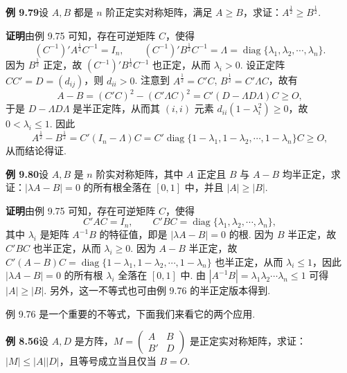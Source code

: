 \documentclass[UTF8,12pt,a4paper,fontset=fandol]{ctexart}
\begin{document}
\noindent\textbf{例 9.79}\quad 设 $A,B$ 都是 $n$ 阶正定实对称矩阵，满足 $A\ge B$，求证：$A^{\frac12}\ge B^{\frac12}$.

\noindent\textbf{证明}\quad 由例 9.75 可知，存在可逆矩阵 $C$，使得
\[
(C^{-1})'A^{\frac12}C^{-1}=I_n,\qquad
(C^{-1})'B^{\frac12}C^{-1}=\Lambda=\operatorname{diag}\{\lambda_1,\lambda_2,\cdots,\lambda_n\}.
\]
因为 $B^{\frac12}$ 正定，故 $(C^{-1})'B^{\frac12}C^{-1}$ 也正定，从而 $\lambda_i>0$. 设正定阵 $CC'=D=(d_{ij})$，则 $d_{ii}>0$. 注意到 $A^{\frac12}=C'C$, $B^{\frac12}=C'\Lambda C$，故有
\[
A-B=(C'C)^2-(C'\Lambda C)^2=C'(D-\Lambda D\Lambda)C\ge O,
\]
于是 $D-\Lambda D\Lambda$ 是半正定阵，从而其 $(i,i)$ 元素 $d_{ii}(1-\lambda_i^2)\ge0$，故 $0<\lambda_i\le1$. 因此
\[
A^{\frac12}-B^{\frac12}=C'(I_n-\Lambda)C
=C'\operatorname{diag}\{1-\lambda_1,1-\lambda_2,\cdots,1-\lambda_n\}C\ge O,
\]
从而结论得证.

\noindent\textbf{例 9.80}\quad 设 $A,B$ 是 $n$ 阶实对称矩阵，其中 $A$ 正定且 $B$ 与 $A-B$ 均半正定，求证：$|\lambda A-B|=0$ 的所有根全落在 $[0,1]$ 中，并且 $|A|\ge |B|$.

\noindent\textbf{证明}\quad 由例 9.75 可知，存在可逆矩阵 $C$，使得
\[
C'AC=I_n,\qquad C'BC=\operatorname{diag}\{\lambda_1,\lambda_2,\cdots,\lambda_n\},
\]
其中 $\lambda_i$ 是矩阵 $A^{-1}B$ 的特征值，即是 $|\lambda A-B|=0$ 的根. 因为 $B$ 半正定，故 $C'BC$ 也半正定，从而 $\lambda_i\ge0$. 因为 $A-B$ 半正定，故 $C'(A-B)C=\operatorname{diag}\{1-\lambda_1,1-\lambda_2,\cdots,1-\lambda_n\}$ 也半正定，从而 $\lambda_i\le1$，因此 $|\lambda A-B|=0$ 的所有根 $\lambda_i$ 全落在 $[0,1]$ 中. 由 $|A^{-1}B|=\lambda_1\lambda_2\cdots\lambda_n\le1$ 可得 $|A|\ge |B|$. 另外，这一不等式也可由例 9.76 的半正定版本得到.

例 9.76 是一个重要的不等式，下面我们来看它的两个应用.

\noindent\textbf{例 8.56}\quad 设 $A,D$ 是方阵，$M=\begin{pmatrix}A&B\\B'&D\end{pmatrix}$ 是正定实对称矩阵，求证：$|M|\le |A||D|$，且等号成立当且仅当 $B=O$.
\end{document}
